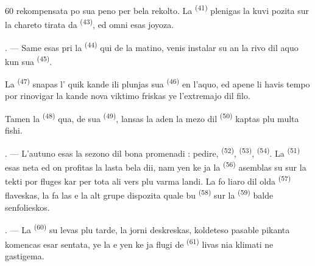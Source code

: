 \begin{VUpage}[62]{60}
\VUcontinue
rekompensata po sua peno per bela rekolto.\nl
La  \textsuperscript{(41)} plenigas la kuvi pozita\nl
sur la chareto tirata da  \textsuperscript{(43)}, ed omni\nl
esas joyoza.

\VUsaut{5.0mm}
\VUsaut{3.4mm}

. --- Same esas pri la  \textsuperscript{(44)} qui de\nl
la matino, venis instalar su an la rivo dil aquo\nl
kun sua  \textsuperscript{(45)}.

\VUblancAlinea
La  \textsuperscript{(47)} snapas l' quik kande ili\nl
plunjas sua  \textsuperscript{(46)} en l'aquo, ed apene li havis\nl
tempo por rinovigar la  kande nova\nl
viktimo friskas ye l'extremajo dil filo.

\VUblancAlinea
Tamen la  \textsuperscript{(48)} qua, de sua \cc
{} \textsuperscript{(49)}, lansas la  aden la mezo dil\nl
{} \textsuperscript{(50)} kaptas plu multa fishi.

. --- L'autuno esas la sezono dil bona\nl
promenadi : pedire,  \textsuperscript{(52)},  \textsuperscript{(53)},\nl
{} \textsuperscript{(54)}. La  \textsuperscript{(51)} esas neta ed on\nl
profitas la lasta bela dii, nam yen ke ja la\nl
{} \textsuperscript{(56)} asemblas su sur la tekti por fluges\cc
kar per tota ali vers plu varma landi. La fo\cc
liaro dil olda  \textsuperscript{(57)} flaveskas, la  fa\cc
las e la alt  grupe dispozita quale bu\cc
{} \textsuperscript{(58)} sur la  \textsuperscript{(59)} balde senfolieskos.

. --- La  \textsuperscript{(60)} su levas plu tarde, la\nl
jorni deskreskas, koldeteso pasable pikanta\nl
komencas esar sentata, ye la  e yen\nl
ke ja flugi de  \textsuperscript{(61)} livas nia klimati ne\cc
gastigema.

\VUsaut{6.0mm}
\VUfilet{22mm}
\end{VUpage}
